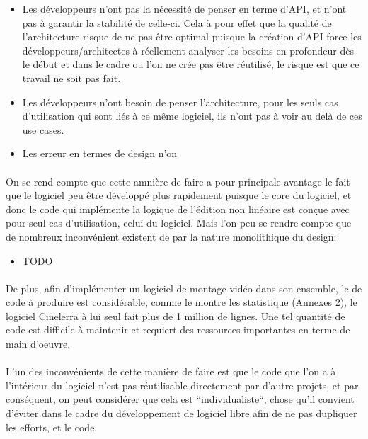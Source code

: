 \begin{itemize}
  \item {Les développeurs n'ont pas la nécessité de penser
    en terme d'API, et n'ont pas à garantir la stabilité de
    celle-ci. Cela à pour effet que la qualité de l'architecture
    risque de ne pas être optimal puisque la création d'API force
    les développeurs/architectes à réellement analyser les besoins
    en profondeur dès le début et dans le cadre ou l'on ne crée pas
    être réutilisé, le risque est que ce travail ne soit pas fait.}
  \item {Les développeurs n'ont besoin de penser l'architecture, pour
    les seuls cas d'utilisation qui sont liés à ce même logiciel, %
    ils n'ont pas à voir au delà de ces use cases.}
  \item {Les erreur en termes de design n'on}
\end {itemize}

\paragraph{} On se rend compte que cette amnière de faire a pour
principale avantage le fait que le logiciel peu être développé plus
rapidement puisque le core du logiciel, et donc le code qui implémente
la logique de l'édition non linéaire est conçue avec pour seul cas
d'utilisation, celui du logiciel. Mais l'on peu se rendre compte que de
nombreux inconvénient existent de par la nature monolithique du design:

\begin{itemize}
  \item{TODO}
\end{itemize}

\paragraph{} De plus, afin d'implémenter un logiciel de montage vidéo
dans son ensemble, le de code à produire est considérable, comme
le montre les statistique (Annexes 2), le logiciel Cinelerra à lui
seul fait plus de 1 million de lignes. Une tel quantité de code est
difficile à maintenir et requiert des ressources importantes en terme
de main d'oeuvre.

\paragraph{} L'un des inconvénients de cette manière de faire est que
le code que l'on a à l'intérieur du logiciel n'est pas réutilisable
directement par d'autre projets, et par conséquent, on peut considérer
que cela est ``individualiste``, chose qu'il convient d'éviter dans le
cadre du développement de logiciel libre afin de ne pas dupliquer les
efforts, et le code.

